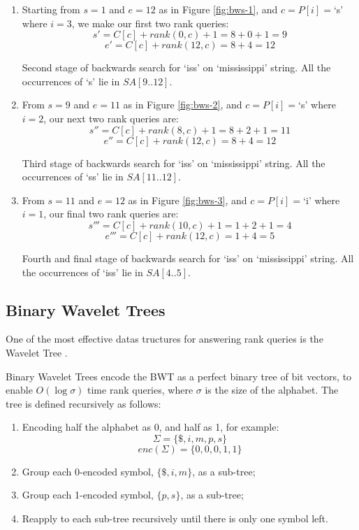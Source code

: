 \begin{enumerate}
	\item
		Starting from $s = 1$ and $e = 12$ as in Figure \ref{fig:bws-1},
		and $c = P[i] = $`s' where $i = 3$, we make our first two rank queries:
			$$s' = C[c] + rank(0, c) + 1 = 8 + 0 + 1 = 9$$
			$$e' = C[c] + rank(12, c) = 8 + 4 = 12$$
		
				{Second stage of backwards search for `iss' on `mississippi'
				string. All the occurrences of `s' lie in $SA[9..12]$.}
\clearpage				
	\item
		From $s = 9$ and $e = 11$ as in Figure \ref{fig:bws-2},
		and $c = P[i] = $`s' where $i = 2$, our next two rank queries are:
			$$s'' = C[c] + rank(8, c) + 1 = 8 + 2 + 1 = 11$$
			$$e'' = C[c] + rank(12, c) = 8 + 4 = 12$$
	
			
				{Third stage of backwards search for `iss' on `mississippi'
				string. All the occurrences of `ss' lie in $SA[11..12]$.}
	
	\item
		From $s = 11$ and $e = 12$ as in Figure \ref{fig:bws-3},
		and $c = P[i] = $`i' where $i = 1$, our final two rank queries are:
			$$s''' = C[c] + rank(10, c) + 1 = 1 + 2 + 1 = 4$$
			$$e''' = C[c] + rank(12, c) = 1 + 4 = 5$$
			
			
				{Fourth and final stage of backwards search for `iss' on
				`mississippi' string. All the occurrences of `iss' lie in
				$SA[4..5]$.}
				
\end{enumerate}

\clearpage
\subsection{Binary Wavelet Trees}
One of the most effective datas tructures for answering rank queries is the Wavelet Tree \cite{claude2008, ferragina2009, ferragina2007, grossi2003, makinen2007a}.

Binary Wavelet Trees encode the BWT as a perfect binary tree of bit vectors, to 
enable $O(\log \sigma)$ time rank queries, where $\sigma$ is the size of the alphabet. The tree is defined recursively as follows:

\begin{enumerate}
    \item
		Encoding half the alphabet as 0, and half as 1, for example:
    		$$\Sigma = \{ \$, i, m, p, s \}$$
			$$enc(\Sigma) = \{ 0, 0, 0, 1, 1 \}$$
    \item
		Group each 0-encoded symbol, $\{ \$, i, m \}$, as a sub-tree;
    \item
		Group each 1-encoded symbol, $\{ p, s \}$, as a sub-tree;
    \item
		Reapply to each sub-tree recursively until there is only one symbol
    	left.
\end{enumerate}

